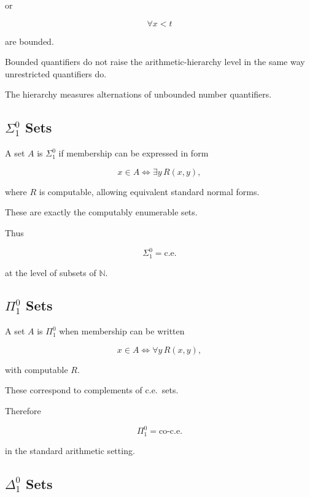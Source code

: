 or

\[
\boxed{
\forall x<t
}
\]

are bounded.

Bounded quantifiers do not raise the arithmetic-hierarchy level in the same
way unrestricted quantifiers do.

The hierarchy measures alternations of unbounded number quantifiers.

\subsection{\(\Sigma^0_1\) Sets}
\label{subsec:sigma-zero-one}

A set \(A\) is \(\Sigma^0_1\) if membership can be expressed in form

\[
\boxed{
x\in A
\iff
\exists y\,
R(x,y),
}
\]

where \(R\) is computable, allowing equivalent standard normal forms.

These are exactly the computably enumerable sets.

Thus

\[
\boxed{
\Sigma^0_1
=
\text{c.e.}
}
\]

at the level of subsets of \(\mathbb{N}\).

\subsection{\(\Pi^0_1\) Sets}
\label{subsec:pi-zero-one}

A set \(A\) is \(\Pi^0_1\) when membership can be written

\[
\boxed{
x\in A
\iff
\forall y\,
R(x,y),
}
\]

with computable \(R\).

These correspond to complements of c.e.\ sets.

Therefore

\[
\boxed{
\Pi^0_1
=
\text{co-c.e.}
}
\]

in the standard arithmetic setting.

\subsection{\(\Delta^0_1\) Sets}
\label{subsec:delta-zero-one}

